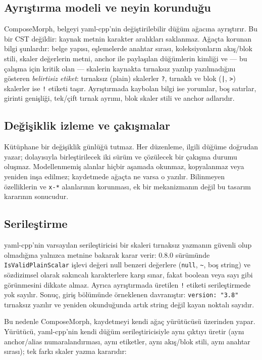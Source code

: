 \documentclass[conference]{IEEEtran}
\begin{document}
\subsection{Ayrıştırma modeli ve neyin korunduğu}
ComposeMorph, belgeyi yaml-cpp'nin değiştirilebilir düğüm ağacına
ayrıştırır. Bu bir CST değildir: kaynak metnin karakter aralıkları
saklanmaz. Ağaçta korunan bilgi şunlardır: belge yapısı, eşlemelerde
anahtar sırası, koleksiyonların akış/blok stili, skaler değerlerin metni,
anchor ile paylaşılan düğümlerin kimliği ve --- bu çalışma için kritik
olan --- skalerin kaynakta tırnaksız yazılıp yazılmadığını gösteren
\emph{belirtisiz etiket}: tırnaksız (plain) skalerler \texttt{?},
tırnaklı ve blok (\texttt{|}, \texttt{>}) skalerler ise \texttt{!} etiketi
taşır. Ayrıştırmada kaybolan bilgi ise yorumlar, boş satırlar, girinti
genişliği, tek/çift tırnak ayrımı, blok skaler stili ve anchor adlarıdır.

\subsection{Değişiklik izleme ve çakışmalar}
Kütüphane bir değişiklik günlüğü tutmaz. Her düzenleme, ilgili düğüme
doğrudan yazar; dolayısıyla birleştirilecek iki sürüm ve çözülecek bir
çakışma durumu oluşmaz. Modellenmemiş alanlar hiçbir aşamada okunmaz,
kopyalanmaz veya yeniden inşa edilmez; kaydetmede ağaçta ne varsa o
yazılır. Bilinmeyen özelliklerin ve \texttt{x-*} alanlarının korunması,
ek bir mekanizmanın değil bu tasarım kararının sonucudur.

\subsection{Serileştirme}
yaml-cpp'nin varsayılan serileştiricisi bir skaleri tırnaksız yazmanın
güvenli olup olmadığına yalnızca metnine bakarak karar verir: 0.8.0
sürümünde \texttt{IsValidPlainScalar} işlevi değeri null benzeri
değerlere (\texttt{null}, \texttt{\textasciitilde}, boş string) ve
sözdizimsel olarak sakıncalı karakterlere karşı sınar, fakat boolean veya
sayı gibi görünmesini dikkate almaz. Ayrıca ayrıştırmada üretilen
\texttt{!} etiketi serileştirmede yok sayılır. Sonuç, giriş bölümünde
örneklenen davranıştır:
\texttt{version: "3.8"} tırnaksız yazılır ve yeniden okunduğunda artık
string değil kayan noktalı sayıdır.

Bu nedenle ComposeMorph, kaydetmeyi kendi ağaç yürütücüsü üzerinden yapar.
Yürütücü, yaml-cpp'nin kendi düğüm serileştiricisiyle aynı çıktıyı üretir
(aynı anchor/alias numaralandırması, aynı etiketler, aynı akış/blok stili,
aynı anahtar sırası); tek farkı skaler yazma kararıdır:
\end{document}

